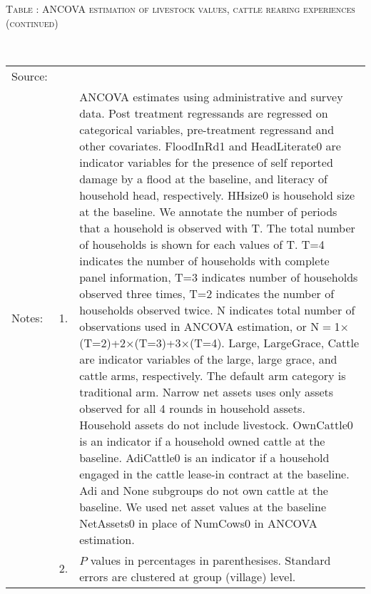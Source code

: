 \vspace{-1cm}\hspace{-1cm}\begin{minipage}[t]{14cm}
\hfil\textsc{\normalsize Table \thetable: ANCOVA estimation of livestock values, cattle rearing experiences (continued)\label{tab ANCOVA net assets experience 2}}\\
\setlength{\tabcolsep}{1pt}
\setlength{\baselineskip}{8pt}
\renewcommand{\arraystretch}{.52}
\hfil{}\\
\renewcommand{\arraystretch}{.8}
\setlength{\tabcolsep}{1pt}
\begin{tabular}{>{\hfill\scriptsize}p{1cm}<{}>{\hfill\scriptsize}p{.25cm}<{}>{\scriptsize}p{12cm}<{\hfill}}
Source:& \multicolumn{2}{l}{\scriptsize Estimated with GUK administrative and survey data.}\\
Notes: & 1. & ANCOVA estimates using administrative and survey data. Post treatment regressands are regressed on categorical variables, pre-treatment regressand and other covariates. \textsf{FloodInRd1} and \textsf{HeadLiterate0} are indicator variables for the presence of self reported damage by a flood at the baseline, and literacy of household head, respectively. \textsf{HHsize0} is household size at the baseline. We annotate the number of periods that a household is observed with \textsf{T}. The total number of households is shown for each values of \textsf{T}. \textsf{T=4} indicates the number of households with complete panel information, \textsf{T=3} indicates number of households observed three times, \textsf{T=2} indicates the number of households observed twice. \textsf{N} indicates total number of observations used in ANCOVA estimation, or \textsf{N$=$1$\times$(T=2)+2$\times$(T=3)+3$\times$(T=4)}.  \textsf{Large}, \textsf{LargeGrace}, \textsf{Cattle} are indicator variables of the \textsf{large}, \textsf{large grace}, and \textsf{cattle} arms, respectively. The default arm category is \textsf{traditional} arm. Narrow net assets uses only assets observed for all 4 rounds in household assets. Household assets do not include livestock. \textsf{OwnCattle0} is an indicator if a household owned cattle at the baseline. \textsf{AdiCattle0} is an indicator if a household engaged in the cattle lease-in contract at the baseline.  \textsf{Adi} and \textsf{None} subgroups do not own cattle at the baseline. We used net asset values at the baseline \textsf{NetAssets0} in place of \textsf{NumCows0} in ANCOVA estimation. \\
& 2. & $P$ values in percentages in parenthesises. Standard errors are clustered at group (village) level.
\end{tabular}
\end{minipage}



